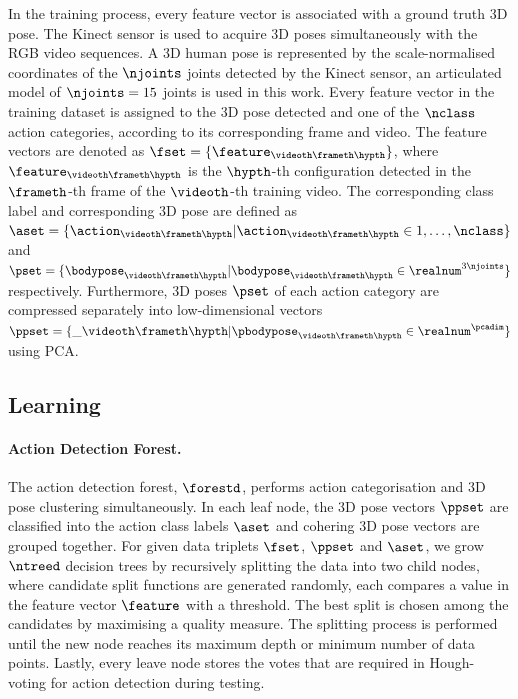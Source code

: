 In the training process, every feature vector is associated with a ground truth 3D pose.
The Kinect sensor is used to acquire 3D poses simultaneously with the RGB video sequences. 
A 3D human pose is represented by the scale-normalised coordinates of the $\njoints$ joints detected by the Kinect sensor, an articulated model of $\njoints=15$ joints is used in this work. 
Every feature vector in the training dataset is assigned to the 3D pose detected and one of the $\nclass$ action categories, according to its corresponding frame and video. The feature vectors are denoted as $\fset = \{\feature_{\videoth\frameth\hypth}\}$, where $\feature_{\videoth\frameth\hypth}$ is the $\hypth$-th configuration detected in the $\frameth$-th frame of the $\videoth$-th training video. The corresponding class label and corresponding 3D pose
are defined as  $\aset = \{\action_{\videoth\frameth\hypth} | \action_{\videoth\frameth\hypth} \in 1,\dots,\nclass \}$ and $\pset = \{\bodypose_{\videoth\frameth\hypth} | \bodypose_{\videoth\frameth\hypth} \in \realnum^{3\njoints}\}$ respectively.  
Furthermore, 3D poses $\pset$ of each action category are compressed separately into low-dimensional vectors $\ppset = \{\_{\videoth\frameth\hypth}  | \pbodypose_{\videoth\frameth\hypth} \in \realnum^{\pcadim} \}$ using PCA. 







\subsection{Learning} 

\paragraph{Action Detection Forest.}
\label{sec/body/adflearn}
The action detection forest, $\forestd$, performs action categorisation and 3D pose clustering simultaneously. 
In each leaf node, the 3D pose vectors $\ppset$ are classified into the action class labels $\aset$ and cohering 3D pose vectors are grouped together.
For given data triplets $\fset$, $\ppset$ and $\aset$, we grow $\ntreed$ decision trees by recursively splitting the data into two child nodes, where candidate split functions are generated randomly, each compares a value in the feature vector $\feature$ with a threshold. The best split is chosen among the candidates by maximising a quality measure. The splitting process is performed until the new node reaches its maximum depth or minimum number of data points. Lastly, every leave node stores the votes that are required in Hough-voting for action detection during testing. 

